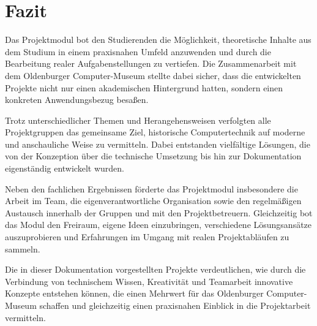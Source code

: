 \chapter{Fazit}

Das Projektmodul bot den Studierenden die Möglichkeit, theoretische Inhalte aus dem Studium in einem praxisnahen Umfeld anzuwenden und durch die Bearbeitung realer Aufgabenstellungen zu vertiefen. Die Zusammenarbeit mit dem Oldenburger Computer-Museum stellte dabei sicher, dass die entwickelten Projekte nicht nur einen akademischen Hintergrund hatten, sondern einen konkreten Anwendungsbezug besaßen.

Trotz unterschiedlicher Themen und Herangehensweisen verfolgten alle Projektgruppen das gemeinsame Ziel, historische Computertechnik auf moderne und anschauliche Weise zu vermitteln. Dabei entstanden vielfältige Lösungen, die von der Konzeption über die technische Umsetzung bis hin zur Dokumentation eigenständig entwickelt wurden.

Neben den fachlichen Ergebnissen förderte das Projektmodul insbesondere die Arbeit im Team, die eigenverantwortliche Organisation sowie den regelmäßigen Austausch innerhalb der Gruppen und mit den Projektbetreuern. Gleichzeitig bot das Modul den Freiraum, eigene Ideen einzubringen, verschiedene Lösungsansätze auszuprobieren und Erfahrungen im Umgang mit realen Projektabläufen zu sammeln.

Die in dieser Dokumentation vorgestellten Projekte verdeutlichen, wie durch die Verbindung von technischem Wissen, Kreativität und Teamarbeit innovative Konzepte entstehen können, die einen Mehrwert für das Oldenburger Computer-Museum schaffen und gleichzeitig einen praxisnahen Einblick in die Projektarbeit vermitteln.
